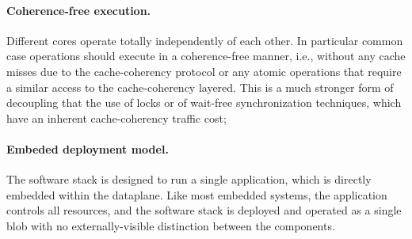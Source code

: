 \paragraph{Coherence-free execution.} 
Different cores operate totally independently
of each other.  In particular common case operations should execute in
a coherence-free manner, i.e., without any cache misses due to the
cache-coherency protocol or any atomic operations that require a
similar access to the cache-coherency layered. This is a much stronger
form of decoupling that the use of locks or of wait-free
synchronization techniques, which have an inherent cache-coherency
traffic cost; 

\paragraph{Embeded deployment model.} 

The software stack is designed to run a single
application, which is directly embedded within the dataplane.  Like
most embedded systems, the application controls all resources, and the
software stack is deployed and operated as a single blob with no
externally-visible distinction between the components.








